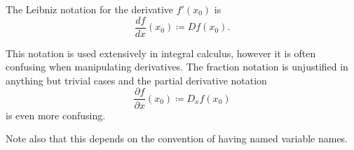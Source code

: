 \begin{remark}
\begin{remenum}
     The Leibniz notation for the derivative \( f'(x_0) \) is
    \begin{equation*}
      \frac {df} {dx} (x_0) \coloneqq D f(x_0).
    \end{equation*}

    This notation is used extensively in integral calculus, however it is often confusing when manipulating derivatives. The fraction notation is unjustified in anything but trivial cases and the partial derivative notation
    \begin{equation*}
      \frac {\partial f} {\partial x} (x_0) \coloneqq D_x f(x_0)
    \end{equation*}
    is even more confusing.

   Note also that this depends on the convention of having named variable names.
  \end{remenum}
\end{remark}

